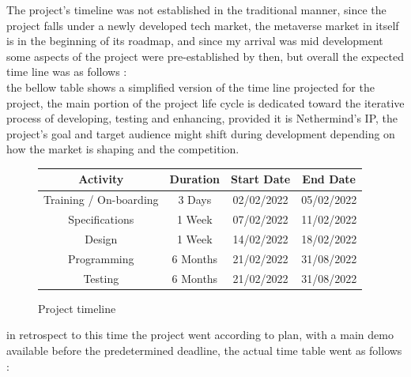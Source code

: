     The project’s timeline was not established in the traditional manner, since the project falls under a newly developed tech market, the metaverse market in itself is in the beginning of its roadmap, and since my arrival was mid development some aspects of the project were pre-established by then, but overall the expected time line was as follows :  \\
    the bellow table shows a simplified version of the time line projected for the project, the main portion of the project life cycle is dedicated toward the iterative process of developing, testing and enhancing, provided it is Nethermind's IP, the project's goal and target audience might shift during development depending on how the market is shaping and the competition. 
  \begin{figure}[H]%
    \center%
    \begin{center}
        \begin{tabular}{||c c c c||} 
         \hline
         Activity & Duration & Start Date & End Date \\ [0.5ex] 
         \hline\hline
         Training / On-boarding & 3 Days & 02/02/2022 & 05/02/2022 \\ 
         \hline
         Specifications & 1 Week & 07/02/2022 & 11/02/2022 \\
         \hline
         Design & 1 Week & 14/02/2022 & 18/02/2022 \\
         \hline
         Programming & 6 Months & 21/02/2022  & 31/08/2022 \\ 
         \hline
         Testing & 6 Months & 21/02/2022 & 31/08/2022 \\
         \hline
        \end{tabular}
    \end{center}
    \caption[projected Time table of the project]{Project timeline}\label{fig:test}%
  \end{figure}
  in retrospect to this time the project went according to plan, with a main demo available before the predetermined deadline, 
  the actual time table went as follows :
